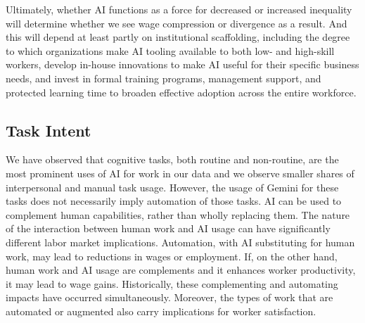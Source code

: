 \documentclass[11pt,a4paper]{article}
\begin{document}
Ultimately, whether AI functions as a force for decreased or increased inequality will determine whether we see wage compression or divergence as a result. And this will depend at least partly on institutional scaffolding, including the degree to which organizations make AI tooling available to both low- and high-skill workers, develop in-house innovations to make AI useful for their specific business needs, and invest in formal training programs, management support, and protected learning time to broaden effective adoption across the entire workforce.

\subsection{Task Intent}

We have observed that cognitive tasks, both routine and non-routine, are the most prominent uses of AI for work in our data and we observe smaller shares of interpersonal and manual task usage. However, the usage of Gemini for these tasks does not necessarily imply automation of those tasks. AI can be used to complement human capabilities, rather than wholly replacing them. The nature of the interaction between human work and AI usage can have significantly different labor market implications. Automation, with AI substituting for human work, may lead to reductions in wages or employment. If, on the other hand, human work and AI usage are complements and it enhances worker productivity, it may lead to wage gains. Historically, these complementing and automating impacts have occurred simultaneously. Moreover, the types of work that are automated or augmented also carry implications for worker satisfaction.
\end{document}
